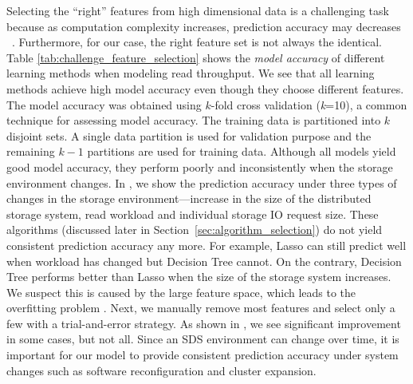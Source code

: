 Selecting the ``right'' features from high dimensional data
is a challenging task because
as computation complexity increases, prediction accuracy may decreases
~\cite{guyon2003introduction, Saeys12007}.
Furthermore, for our case, the right feature set is not always the identical.
Table \ref{tab:challenge_feature_selection} shows the \emph{model accuracy} of different learning methods when modeling 
read throughput. 
We see that all learning methods achieve high model accuracy
even though they choose different features. 
The model accuracy was obtained using $k$-fold cross validation (\textit{k}=10),
a common technique for assessing model accuracy. 
The training data is partitioned into $k$ disjoint sets. 
A single data partition is used for validation purpose and the remaining $k-1$ partitions are used for training data.
Although all models yield good model accuracy, they perform poorly and inconsistently when the storage environment changes. 
In \myfigure{\ref{fig:challenge_generalization}},
we show the prediction accuracy under
three types of changes in the storage environment---increase in the size of the distributed 
storage system, read workload and individual storage IO request size.
These algorithms (discussed later in Section~\ref{sec:algorithm_selection}) do not yield consistent prediction accuracy any more. 
For example, Lasso can still predict well when workload has changed but Decision Tree cannot.
On the contrary, Decision Tree performs better than Lasso when the size of the storage system increases.
We suspect this is caused by the large feature space, which leads to the overfitting problem \cite{domingos2012few, hastie2005}.
Next, we manually remove most features and select only a few with a trial-and-error strategy.
As shown in \myfigure{\ref{fig:challenge_generalization}}, we see significant improvement in some cases, but not all. 
Since an SDS environment can change over time, it is important for our model to provide consistent prediction accuracy under system changes
such as software reconfiguration and cluster expansion.






